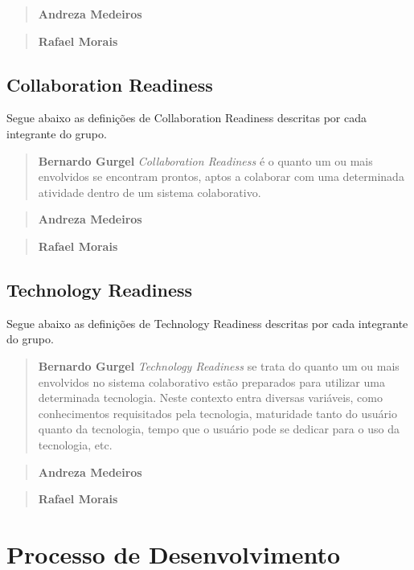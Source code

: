 \documentclass{acm_proc_article-sp}
\begin{document}
\begin{quote}\textbf{Andreza Medeiros}
\end{quote}

\begin{quote}\textbf{Rafael Morais}
\end{quote}

\subsection{Collaboration Readiness}
Segue abaixo as definições de Collaboration Readiness descritas por cada integrante do grupo.

\begin{quote}\textbf{Bernardo Gurgel}
\textsl{Collaboration Readiness} é o quanto um ou mais envolvidos se encontram prontos, aptos a colaborar com uma determinada atividade dentro de um sistema colaborativo.
\end{quote}

\begin{quote}\textbf{Andreza Medeiros}
\end{quote}

\begin{quote}\textbf{Rafael Morais}
\end{quote}

\subsection{Technology Readiness}
Segue abaixo as definições de Technology Readiness descritas por cada integrante do grupo.

\begin{quote}\textbf{Bernardo Gurgel}
\textsl{Technology Readiness} se trata do quanto um ou mais envolvidos no sistema colaborativo estão preparados para utilizar uma determinada tecnologia. Neste contexto entra diversas variáveis, como conhecimentos requisitados pela tecnologia, maturidade tanto do usuário quanto da tecnologia, tempo que o usuário pode se dedicar para o uso da tecnologia, etc.
\end{quote}

\begin{quote}\textbf{Andreza Medeiros}
\end{quote}

\begin{quote}\textbf{Rafael Morais}
\end{quote}

\section{Processo de Desenvolvimento}
\end{document}
